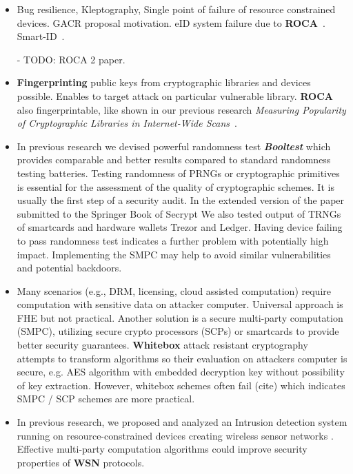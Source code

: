 \documentclass[
  digital, %
  twoside, %
  table,   %
  lof,     %
  lot,     %
]{fithesis3}
\theoremstyle{definition}
\theoremstyle{remark}
\begin{document}
\begin{ecmmnt}%
\begin{itemize}
	\item Bug resilience, Kleptography, Single point of failure of resource constrained devices. GACR proposal motivation. eID system failure due to {\bf{ROCA}}~\cite{2017-ccs-nemec}. Smart-ID~\cite{smart_id_ee}. 
	
	- TODO: ROCA 2 paper.
	
	\item {\bf{Fingerprinting}} public keys from cryptographic libraries and devices possible. Enables to target attack on particular vulnerable library. {\bf{ROCA}} also fingerprintable, like shown in our previous research {\it{Measuring Popularity of Cryptographic Libraries in Internet-Wide Scans}}~\cite{2017-acsac-nemec}.
	
	\item In previous research we devised powerful randomness test {\bf{\emph{Booltest}}} \cite{booltest_secrypt2017} which provides comparable and better results compared to standard randomness testing batteries. Testing randomness of PRNGs or cryptographic primitives is essential for the assessment of the quality of cryptographic schemes. It is usually the first step of a security audit. In the extended version of the paper submitted to the Springer Book of Secrypt We also tested output of TRNGs of smartcards and hardware wallets Trezor and Ledger. Having device failing to pass randomness test indicates a further problem with potentially high impact. Implementing the SMPC may help to avoid similar vulnerabilities and potential backdoors. 
	
	\item Many scenarios (e.g., DRM, licensing, cloud assisted computation) require computation with sensitive data on attacker computer. Universal approach is FHE but not practical. Another solution is a secure multi-party computation (SMPC), utilizing secure crypto processors (SCPs) or smartcards to provide better security guarantees. {\bf{Whitebox}} attack resistant cryptography \cite{whitebox_klinec_santacrypt2013,Klinec2013thesis} attempts to transform algorithms so their evaluation on attackers computer is secure, e.g. AES algorithm with embedded decryption key without possibility of key extraction. However, whitebox schemes often fail (cite) which indicates SMPC / SCP schemes are more practical.
	
	\item In previous research, we proposed and analyzed an Intrusion detection system running on resource-constrained devices creating wireless sensor networks \cite{wsnprotectlayer}. Effective multi-party computation algorithms could improve security properties of {\bf{WSN}} protocols.
	

\end{itemize}
\end{ecmmnt}
\end{document}
